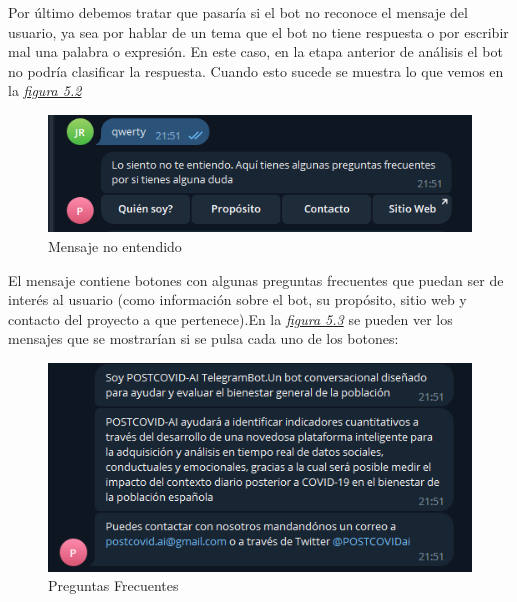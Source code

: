 Por último debemos tratar que pasaría si el bot no reconoce el mensaje del usuario, ya sea por hablar de un tema que el bot no tiene respuesta o por escribir mal una palabra o expresión. En este caso, en la etapa anterior de análisis el bot no podría clasificar la respuesta. Cuando esto sucede se muestra lo que vemos en la \textit{\hyperref[fig:no-entendido]{figura 5.2}}\vspace{1cm}

\begin{figure}[!ht]
    \centering
    \includegraphics[width=1\textwidth]{imagenes/no_respuesta.png}
    \caption{ Mensaje no entendido }
    \label{fig:no-entendido}
\end{figure}\vspace{0.3cm}

El mensaje contiene botones con algunas preguntas frecuentes que puedan ser de interés al usuario (como información sobre el bot, su propósito, sitio web y contacto del proyecto a que pertenece).En la \textit{\hyperref[fig:faq]{figura 5.3}} se pueden ver los mensajes que se mostrarían si se pulsa cada uno de los botones:\vspace{0.3cm}

\begin{figure}[!ht]
    \centering
    \includegraphics[width=1\textwidth]{imagenes/preguntas_frecuentes.png}
    \caption{ Preguntas Frecuentes }
    \label{fig:faq}
\end{figure}\vspace{0.3cm}

